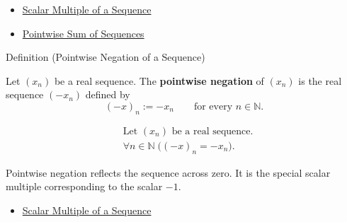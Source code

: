 \begin{dependencies}
\begin{itemize}
  \item \hyperref[def:scalar-multiple-sequence]{Scalar Multiple of a Sequence}
  \item \hyperref[def:pointwise-sum-sequence]{Pointwise Sum of Sequences}
\end{itemize}
\end{dependencies}


\begin{definitionbox}{Definition (Pointwise Negation of a Sequence)}
\begin{definition}
\label{def:pointwise-negation-sequence}
Let $(x_n)$ be a real sequence. The \textbf{pointwise negation} of
$(x_n)$ is the real sequence $(-x_n)$ defined by
\[
(-x)_n := -x_n
\qquad
\text{for every } n\in\mathbb{N}.
\]
\end{definition}
\end{definitionbox}

\begin{remark*}
\[
\begin{aligned}
&\text{Let } (x_n) \text{ be a real sequence.}\\
&\forall n\in\mathbb{N}\;\bigl((-x)_n=-x_n\bigr).
\end{aligned}
\]
\end{remark*}

\begin{remark*}[Interpretation]
Pointwise negation reflects the sequence across zero. It is the special scalar
multiple corresponding to the scalar $-1$.
\end{remark*}

\begin{dependencies}
\begin{itemize}
  \item \hyperref[def:scalar-multiple-sequence]{Scalar Multiple of a Sequence}
\end{itemize}
\end{dependencies}


